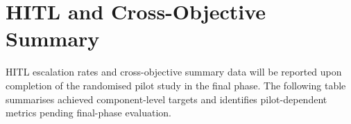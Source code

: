 \begin{table}[htbp]
\centering
\caption{Target performance metrics for the planned pilot study ($n=30$, final phase).}
\label{tab:ch6-burden}
\small\renewcommand{\arraystretch}{1.35}
\end{table}

\section{HITL and Cross-Objective Summary}
\label{sec:res-summary}

HITL escalation rates and cross-objective summary data will be reported upon
completion of the randomised pilot study in the final phase.
The following table summarises achieved component-level targets and identifies
pilot-dependent metrics pending final-phase evaluation.

